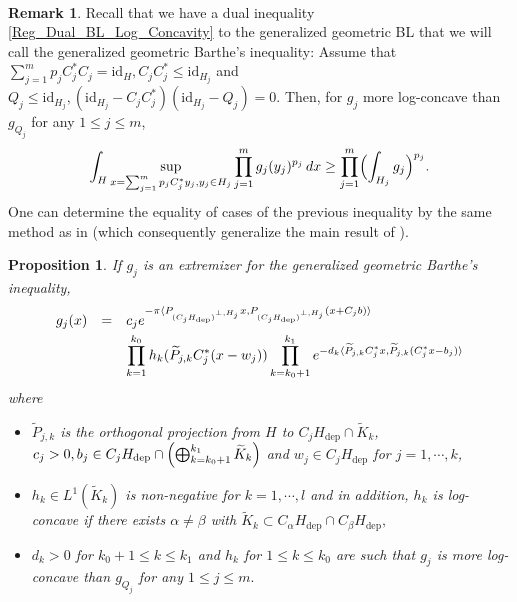 \documentclass[11pt,a4paper,reqno]{amsart}
\numberwithin{equation}{section}
\newtheorem{proposition}[theorem]{Proposition}
\theoremstyle{definition}
\newtheorem{remark}[theorem]{Remark}
\newcommand{\nm}{\noalign{\smallskip}}
\newcommand{\ds}{\displaystyle}
\renewcommand{\tilde}{\widetilde}
\newcommand{\<}{\ensuremath \leq}
\renewcommand{\>}{\ensuremath \geq}
\renewcommand{\tilde}{\widetilde}
\begin{document}
\hfill \\

\begin{remark}
Recall that we have a dual inequality \cref{Reg_Dual_BL_Log_Concavity} to the generalized geometric BL that we will call the generalized geometric Barthe's inequality: Assume that $\sum_{j=1}^m p_jC_j^*C_j=\mathrm{id}_H, C_jC_j^* \leq \mathrm{id}_{H_j}$ and $Q_j \leq \mathrm{id}_{H_j}, (\mathrm{id}_{H_j}-C_jC_j^*)(\mathrm{id}_{H_j}-Q_j)=0.$ Then, for $g_j$ more log-concave than $g_{Q_j}$ for any $1 \leq j \leq m$, $$\int_{H}\sup_{x=\sum_{j=1}^m p_jC_j^*y_j, y_j \in H_j}\prod_{j=1}^m g_j(y_j)^{p_j}\, dx \geq \prod_{j=1}^m \Bigl(\int_{H_j}g_j \Bigl)^{p_j}.$$ One can determine the equality of cases of the previous inequality by the same method as in \cite{Reverse_BL_equality} (which consequently generalize the main result of \cite{Reverse_BL_equality}).
\end{remark}


\begin{proposition}
    If $g_j$ is an extremizer for the generalized geometric Barthe's inequality, $$\begin{array}{lll}
    \ds g_j(x) &=& \ds c_j e^{-\pi\langle P_{(C_jH_{\mathrm{dep}})^{\perp,H_j}}x, P_{(C_jH_{\mathrm{dep}})^{\perp,H_j}}(x+C_jb)\rangle} \\
    \nm 
    && \ds \prod_{k=1}^{k_0}h_k(\tilde P_{j,k}C_j^*(x-w_j))\prod_{k=k_0+1}^{k_1}e^{-d_k\langle \tilde P_{j,k}C_j^*x,\tilde P_{j,k}(C_j^*x-b_j)\rangle}
    \end{array}$$ where \begin{itemize}
        \item [(i)] $\tilde P_{j,k}$ is the orthogonal projection from $H$ to $C_jH_{\mathrm{dep}} \cap \tilde K_k$, $c_j>0, b_j \in C_jH_\mathrm{dep} \cap \Bigl( \bigoplus_{k=k_0+1}^{k_1}\tilde K_k\Bigl)$ and $w_j \in C_jH_{\mathrm{dep}}$ for $j=1,\cdots,k$, 
        \item[(ii)] $h_k \in L^1(\tilde K_k)$ is non-negative for $k=1,\cdots,l$ and in addition, $h_k$ is log-concave if there exists $\alpha \neq \beta$ with $\tilde K_k \subset C_\alpha H_{\mathrm{dep}} \cap C_\beta H_{\mathrm{dep}},$ 
        \item[(iii)] $d_k>0$ for $k_0+1 \leq k \leq k_1$ and $h_k$ for $1 \leq k \leq k_0$ are such that $g_j$ is more log-concave than $g_{Q_j}$ for any $1 \leq j \leq m.$
    \end{itemize}
\end{proposition}
\end{document}
